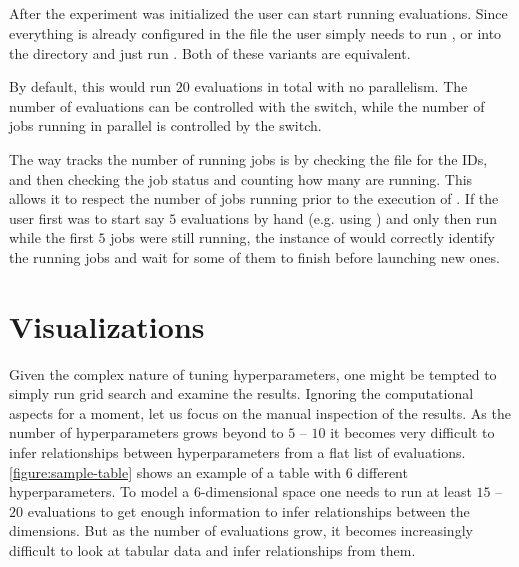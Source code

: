 \subsection{}

After the experiment was initialized the user can start running evaluations. Since everything is already configured in the  file the user simply needs to run , or  into the directory and just run . Both of these variants are equivalent.

By default, this would run $20$ evaluations in total with no parallelism. The number of evaluations can be controlled with the  switch, while the number of jobs running in parallel is controlled by the  switch.

The way  tracks the number of running jobs is by checking the  file for the IDs, and then checking the job status and counting how many are running. This allows it to respect the number of jobs running prior to the execution of . If the user first was to start say $5$ evaluations by hand (e.g. using ) and only then run  while the first $5$ jobs were still running, the instance of  would correctly identify the running jobs and wait for some of them to finish before launching new ones.

\section{Visualizations}

Given the complex nature of tuning hyperparameters, one might be tempted to simply run grid search and examine the results. Ignoring the computational aspects for a moment, let us focus on the manual inspection of the results. As the number of hyperparameters grows beyond to $5$ -- $10$ it becomes very difficult to infer relationships between hyperparameters from a flat list of evaluations. \autoref{figure:sample-table} shows an example of a table with $6$ different hyperparameters. To model a $6$-dimensional space one needs to run at least $15$ -- $20$ evaluations to get enough information to infer relationships between the dimensions. But as the number of evaluations grow, it becomes increasingly difficult to look at tabular data and infer relationships from them.

